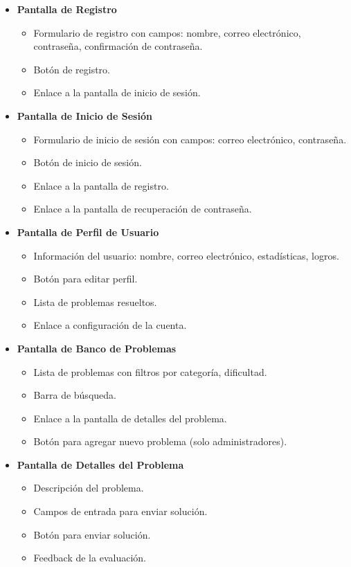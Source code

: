 \begin{itemize}
    \item \textbf{Pantalla de Registro}
    \begin{itemize}
        \item Formulario de registro con campos: nombre, correo electrónico, contraseña, confirmación de contraseña.
        \item Botón de registro.
        \item Enlace a la pantalla de inicio de sesión.
    \end{itemize}

    \item \textbf{Pantalla de Inicio de Sesión}
    \begin{itemize}
        \item Formulario de inicio de sesión con campos: correo electrónico, contraseña.
        \item Botón de inicio de sesión.
        \item Enlace a la pantalla de registro.
        \item Enlace a la pantalla de recuperación de contraseña.
    \end{itemize}

    \item \textbf{Pantalla de Perfil de Usuario}
    \begin{itemize}
        \item Información del usuario: nombre, correo electrónico, estadísticas, logros.
        \item Botón para editar perfil.
        \item Lista de problemas resueltos.
        \item Enlace a configuración de la cuenta.
    \end{itemize}

    \item \textbf{Pantalla de Banco de Problemas}
    \begin{itemize}
        \item Lista de problemas con filtros por categoría, dificultad.
        \item Barra de búsqueda.
        \item Enlace a la pantalla de detalles del problema.
        \item Botón para agregar nuevo problema (solo administradores).
    \end{itemize}

    \item \textbf{Pantalla de Detalles del Problema}
    \begin{itemize}
        \item Descripción del problema.
        \item Campos de entrada para enviar solución.
        \item Botón para enviar solución.
        \item Feedback de la evaluación.
    \end{itemize}


\end{itemize}
